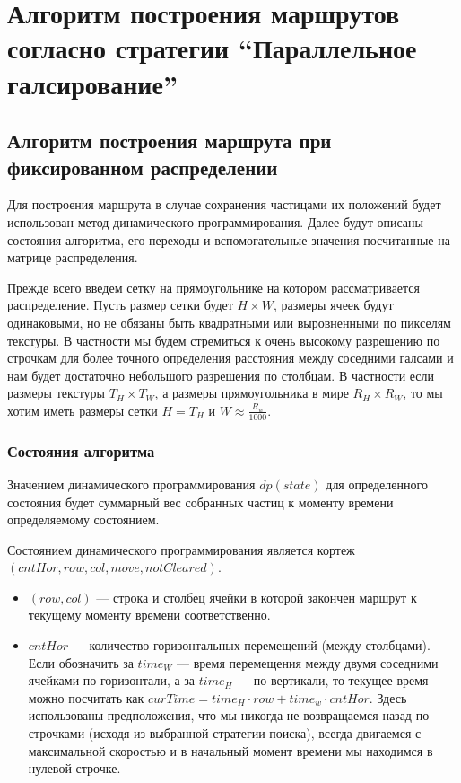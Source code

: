 \chapter{Алгоритм построения маршрутов согласно стратегии
``Параллельное галсирование''}
\section{Алгоритм построения маршрута при
 фиксированном распределении}

\def\dprule{ \rule[-2ex]{0pt}{4ex} }

Для построения маршрута в случае сохранения частицами их положений будет использован метод
динамического программирования. Далее будут описаны состояния алгоритма, его переходы и
вспомогательные значения посчитанные на матрице распределения.

Прежде всего введем сетку на прямоугольнике на котором рассматривается распределение.
Пусть размер сетки будет $H \times W$, размеры ячеек будут одинаковыми, но не обязаны
быть квадратными или выровненными по пикселям текстуры. В частности мы будем стремиться
к очень высокому разрешению по строчкам для более точного определения расстояния между
соседними галсами и нам будет достаточно небольшого разрешения по столбцам. В частности
если размеры текстуры $T_H \times T_W$, а размеры прямоугольника в мире $R_H \times R_W$,
то мы хотим иметь размеры сетки $H = T_H$ и $W \approx \frac {R_w} {1000}$.

\subsection{Состояния алгоритма}
Значением динамического программирования $dp(state)$ для определенного состояния будет
суммарный вес собранных частиц к моменту времени определяемому состоянием.

Состоянием динамического программирования является кортеж $(cntHor, row, col, move, notCleared)$.
\begin{itemize}
\item $(row, col)$ --- строка и столбец ячейки в которой закончен маршрут к текущему моменту времени
соответственно.
\item $cntHor$ --- количество горизонтальных перемещений (между столбцами). Если обозначить
за $time_W$ --- время перемещения между двумя соседними ячейками по горизонтали, а за $time_H$ ---
по вертикали, то текущее время можно посчитать как $curTime = time_H \cdot row + time_w \cdot cntHor$.
Здесь использованы предположения, что мы никогда не возвращаемся назад по строчками (исходя из
выбранной стратегии поиска), всегда двигаемся с максимальной скоростью и в начальный момент
времени мы находимся в нулевой строчке.

\end{itemize}

